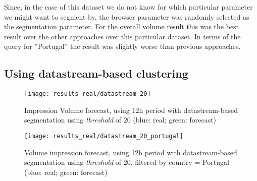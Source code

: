 Since, in the case of this dataset we do not know for which particular parameter
we might want to segment by, the browser parameter was randomly selected as the
segmentation parameter. For the overall volume result this was the best result
over the other approaches over this particular dataset. In terms of the query
for ''Portugal'' the result was slightly worse than previous approaches.

\subsection*{Using datastream-based clustering}

\begin{figure}[!ht]
\centering
\begin{minipage}[t]{0.45\linewidth}
\texttt{[image: results\_real/datastream\_20]} \caption[Volume
impression forecast, real data, clustering datastream]{Impression Volume 
forecast, using 12h period with datastream-based segmentation using
\emph{threshold} of 20 (blue: real; green: forecast)}
\label{fig:vol_real_data_datastream}
\end{minipage}
\quad
\begin{minipage}[t]{0.45\linewidth}
\texttt{[image: results\_real/datastream\_20\_portugal]} \caption[Volume
impression forecast, real data, clustering datastream, filtered]{Volume impression
forecast, using 12h period with datastream-based segmentation using
\emph{threshold} of 20, filtered by country = Portugal  (blue: real; green: forecast)}
\label{fig:vol_real_data_datastream_filtered}
\end{minipage}

\end{figure}

